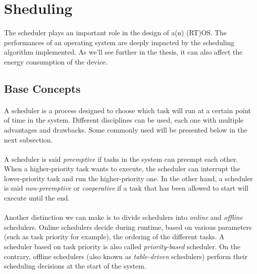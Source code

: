 \section{Sheduling}

\paragraph{}
The scheduler plays an important role in the design of a(n) (RT)OS.
The performances of an operating system are deeply impacted by the scheduling algorithm implemented.
As we'll see further in the thesis, it can also affect the energy consumption of the device.\\

\subsection{Base Concepts}

\paragraph{}
A scheduler is a process designed to choose which task will run at a certain point of time in the system.
Different disciplines can be used, each one with multiple advantages and drawbacks.
Some commonly used will be presented below in the next subsection.

\paragraph{}
A scheduler is said \textit{preemptive} if tasks in the system can preempt each other.
When a higher-priority task wants to execute, the scheduler can interrupt the lower-priority task and run the higher-priority one.
In the other hand, a scheduler is said \textit{non-preemptive} or \textit{cooperative}
    if a task that has been allowed to start will execute until the end.

\paragraph{}
Another distinction we can make is to divide schedulers into \textit{online} and \textit{offline} schedulers.
Online schedulers decide during runtime, based on various parameters (such as task priority for example), the ordering of the different tasks.
A scheduler based on task priority is also called \textit{priority-based} scheduler.
On the contrary, offline schedulers (also known as \textit{table-driven} schedulers) perform their scheduling decisions at the start of the system.

